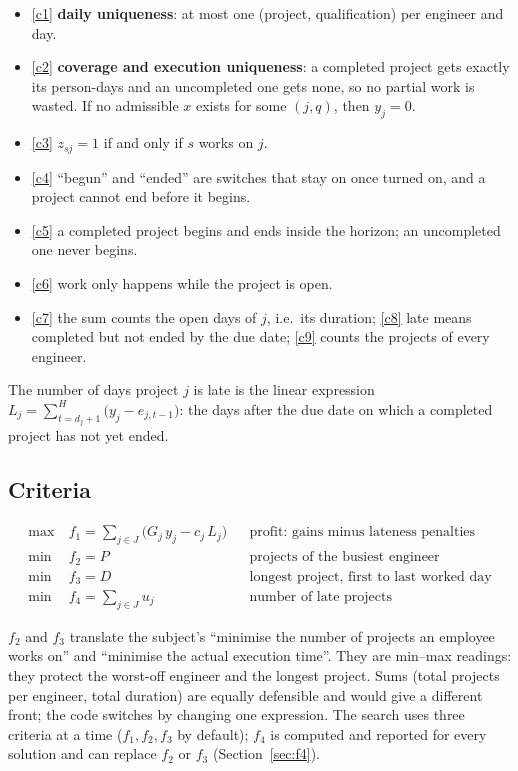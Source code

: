 \documentclass[11pt,a4paper]{article}
\theoremstyle{plain}
\begin{document}
\begin{itemize}
  \item \eqref{c1} \textbf{daily uniqueness}: at most one (project, qualification) per engineer and day.
  \item \eqref{c2} \textbf{coverage and execution uniqueness}: a completed project gets exactly its person-days and an uncompleted one gets none, so no partial work is wasted. If no admissible $x$ exists for some $(j,q)$, then $y_j=0$.
  \item \eqref{c3} $z_{sj}=1$ if and only if $s$ works on $j$.
  \item \eqref{c4} ``begun'' and ``ended'' are switches that stay on once turned on, and a project cannot end before it begins.
  \item \eqref{c5} a completed project begins and ends inside the horizon; an uncompleted one never begins.
  \item \eqref{c6} work only happens while the project is open.
  \item \eqref{c7} the sum counts the open days of $j$, i.e.\ its duration; \eqref{c8} late means completed but not ended by the due date; \eqref{c9} counts the projects of every engineer.
\end{itemize}

The number of days project $j$ is late is the linear expression $L_j=\sum_{t=d_j+1}^{H}\big(y_j-e_{j,t-1}\big)$: the days after the due date on which a completed project has not yet ended.

\subsection{Criteria}

\begin{align}
\max\ & f_1 = \sum_{j\in J}\big(G_j\,y_j - c_j\,L_j\big) && \text{profit: gains minus lateness penalties} \tag{$f_1$}\\
\min\ & f_2 = P && \text{projects of the busiest engineer} \tag{$f_2$}\\
\min\ & f_3 = D && \text{longest project, first to last worked day} \tag{$f_3$}\\
\min\ & f_4 = \textstyle\sum_{j\in J} u_j && \text{number of late projects} \tag{$f_4$}
\end{align}

$f_2$ and $f_3$ translate the subject's ``minimise the number of projects an employee works on'' and ``minimise the actual execution time''. They are min--max readings: they protect the worst-off engineer and the longest project. Sums (total projects per engineer, total duration) are equally defensible and would give a different front; the code switches by changing one expression. The search uses three criteria at a time ($f_1, f_2, f_3$ by default); $f_4$ is computed and reported for every solution and can replace $f_2$ or $f_3$ (Section~\ref{sec:f4}).
\end{document}

